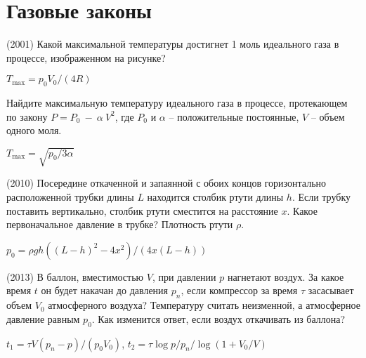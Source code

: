 \section{Газовые законы}

\begin{ex} 
(2001) Какой максимальной температуры достигнет 1 моль идеального газа в процессе, изображенном на рисунке? 
\begin{center}

\end{center}
\begin{ans}
$T_{\max}=p_0V_0/(4R)$
\end{ans}
\end{ex}

\begin{ex}
Найдите максимальную температуру идеального газа в процессе, протекающем по закону $P=P_0~-~\alpha~V^2$, где $P_0$ и $\alpha$ -- положительные постоянные, $V$ -- объем одного моля.
\begin{ans}
$T_{\max} = \sqrt{p_0/3\alpha}$
\end{ans}
\end{ex}

\begin{ex}
(2010) Посередине откаченной и запаянной с обоих концов горизонтально расположенной трубки длины $L$ находится столбик ртути длины $h$. 
Если трубку поставить вертикально, столбик ртути сместится на расстояние $x$. Какое первоначальное давление в трубке? Плотность ртути $\rho$.
\begin{ans}
$p_0 = \rho g h \left( (L-h)^2 - 4x^2 \right)/ (4x(L-h))$
\end{ans}
\end{ex}

\begin{ex}
(2013) В баллон, вместимостью $V$, при давлении $p$ нагнетают воздух. За какое время $t$ он будет накачан до давления $p_n$, если компрессор за время $\tau$ засасывает объем $V_0$ атмосферного воздуха? 
Температуру считать неизменной, а атмосферное давление равным $p_0$. Как изменится ответ, если воздух откачивать из баллона?
\begin{ans}
$t_1 = \tau V(p_n-p)/(p_0V_0)$, $t_2 = \tau \log p/p_n /\log (1+V_0/V)$
\end{ans}
\end{ex}

